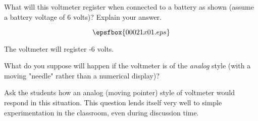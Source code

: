 

What will this voltmeter register when connected to a battery as shown (assume a battery voltage of 6 volts)?  Explain your answer.

$$\epsfbox{00021x01.eps}$$







The voltmeter will register -6 volts.

What do you suppose will happen if the voltmeter is of the {\it analog} style (with a moving "needle" rather than a numerical display)?







Ask the students how an analog (moving pointer) style of voltmeter would respond in this situation.  This question lends itself very well to simple experimentation in the classroom, even during discussion time.




